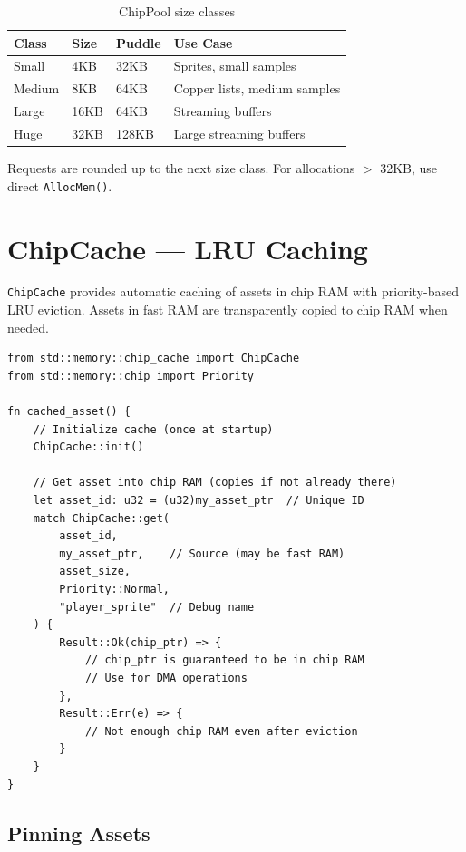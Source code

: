 \begin{table}[h]
\centering
\begin{tabular}{llll}
\textbf{Class} & \textbf{Size} & \textbf{Puddle} & \textbf{Use Case} \\
\hline
Small & 4KB & 32KB & Sprites, small samples \\
Medium & 8KB & 64KB & Copper lists, medium samples \\
Large & 16KB & 64KB & Streaming buffers \\
Huge & 32KB & 128KB & Large streaming buffers \\
\end{tabular}
\caption{ChipPool size classes}
\end{table}

Requests are rounded up to the next size class. For allocations $>$ 32KB, use direct \texttt{AllocMem()}.

\section{ChipCache --- LRU Caching}
\label{sec:chip-cache}

\texttt{ChipCache} provides automatic caching of assets in chip RAM with priority-based LRU eviction. Assets in fast RAM are transparently copied to chip RAM when needed.

\begin{lstlisting}
from std::memory::chip_cache import ChipCache
from std::memory::chip import Priority

fn cached_asset() {
    // Initialize cache (once at startup)
    ChipCache::init()

    // Get asset into chip RAM (copies if not already there)
    let asset_id: u32 = (u32)my_asset_ptr  // Unique ID
    match ChipCache::get(
        asset_id,
        my_asset_ptr,    // Source (may be fast RAM)
        asset_size,
        Priority::Normal,
        "player_sprite"  // Debug name
    ) {
        Result::Ok(chip_ptr) => {
            // chip_ptr is guaranteed to be in chip RAM
            // Use for DMA operations
        },
        Result::Err(e) => {
            // Not enough chip RAM even after eviction
        }
    }
}
\end{lstlisting}

\subsection{Pinning Assets}

